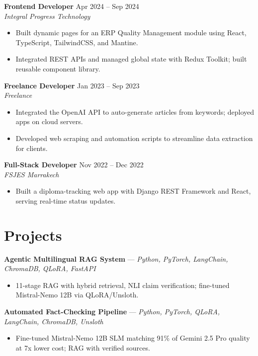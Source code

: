 \documentclass[11pt,a4paper]{article}
\begin{document}
\vspace{2pt}
{\small
\textbf{Frontend Developer} \hfill Apr 2024 -- Sep 2024 \\
\textit{Integral Progress Technology}}
\begin{itemize}[leftmargin=12pt]
  \item {\small Built dynamic pages for an ERP Quality Management module using React, TypeScript, TailwindCSS, and Mantine.}
  \item {\small Integrated REST APIs and managed global state with Redux Toolkit; built reusable component library.}
\end{itemize}

\vspace{2pt}
{\small
\textbf{Freelance Developer} \hfill Jan 2023 -- Sep 2023 \\
\textit{Freelance}}
\begin{itemize}[leftmargin=12pt]
  \item {\small Integrated the OpenAI API to auto-generate articles from keywords; deployed apps on cloud servers.}
  \item {\small Developed web scraping and automation scripts to streamline data extraction for clients.}
\end{itemize}

\vspace{2pt}
{\small
\textbf{Full-Stack Developer} \hfill Nov 2022 -- Dec 2022 \\
\textit{FSJES Marrakech}}
\begin{itemize}[leftmargin=12pt]
  \item {\small Built a diploma-tracking web app with Django REST Framework and React, serving real-time status updates.}
\end{itemize}

\section{Projects}

{\small
\textbf{Agentic Multilingual RAG System} --- \textit{Python, PyTorch, LangChain, ChromaDB, QLoRA, FastAPI}}
\begin{itemize}[leftmargin=12pt]
  \item {\small 11-stage RAG with hybrid retrieval, NLI claim verification; fine-tuned Mistral-Nemo 12B via QLoRA/Unsloth.}
\end{itemize}

\vspace{2pt}
{\small
\textbf{Automated Fact-Checking Pipeline} --- \textit{Python, PyTorch, QLoRA, LangChain, ChromaDB, Unsloth}}
\begin{itemize}[leftmargin=12pt]
  \item {\small Fine-tuned Mistral-Nemo 12B SLM matching 91\% of Gemini 2.5 Pro quality at 7x lower cost; RAG with verified sources.}
\end{itemize}
\end{document}
